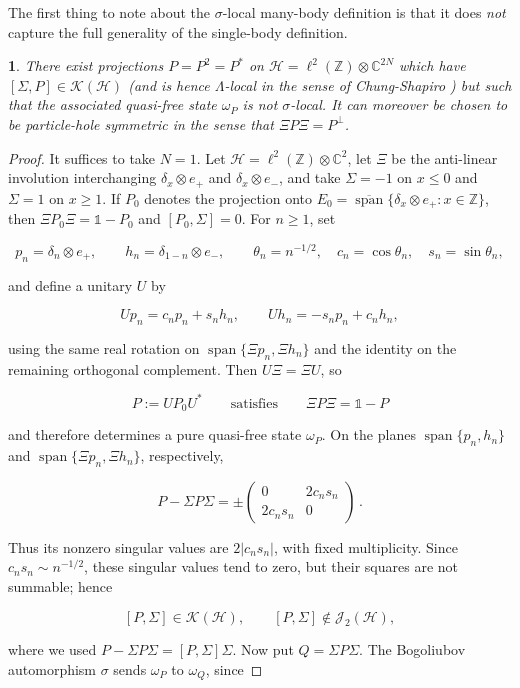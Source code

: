\documentclass[a4paper,10pt]{article}
\numberwithin{equation}{section}
\theoremstyle{plain}
\theoremstyle{plain}
\theoremstyle{plain}
\theoremstyle{plain}
\theoremstyle{plain}
\newtheorem{claim}[claim]{\protect\claimname}
\theoremstyle{remark}
\theoremstyle{definition}
\providecommand{\claimname}{Claim}
\newcommand{\ZZ}{\mathbb{Z}}
\newcommand{\CC}{\mathbb{C}}
\newcommand{\calH}{\mathcal{H}}
\newcommand{\calK}{\mathcal{K}}
\newcommand{\szpan}{\operatorname{span}}
\newcommand{\Id}{\mathds{1}}
\begin{document}
The first thing to note about the $\sigma$-local many-body definition is that it does \emph{not} capture the full generality of the single-body definition.
\begin{claim}
    There exist projections $P=P^2=P^\ast$ on $\calH=\ell^2(\ZZ)\otimes\CC^{2N}$ which have $[\Sigma,P]\in\calK(\calH)$ (and is hence $\Lambda$-local in the sense of Chung-Shapiro \cite{ChungShapiro2023}) but such that the associated quasi-free state $\omega_P$ is \emph{not} $\sigma$-local. It can moreover be chosen to be particle-hole symmetric in the sense that $\Xi P \Xi = P^\perp$.
\end{claim}
\begin{proof}
It suffices to take \(N=1\). Let \(\calH=\ell^2(\ZZ)\otimes\CC^2\), let \(\Xi\) be the anti-linear involution interchanging \(\delta_x\otimes e_+\) and \(\delta_x\otimes e_-\), and take \(\Sigma=-1\) on \(x\leq0\) and \(\Sigma=1\) on \(x\geq1\). If \(P_0\) denotes the projection onto \(E_0=\overline{\szpan}\{\delta_x\otimes e_+:x\in\ZZ\}\), then \(\Xi P_0\Xi=\Id-P_0\) and \([P_0,\Sigma]=0\). For \(n\geq1\), set

$$
p_n=\delta_n\otimes e_+,\qquad h_n=\delta_{1-n}\otimes e_-,\qquad
\theta_n=n^{-1/2},\quad c_n=\cos\theta_n,\quad s_n=\sin\theta_n,
$$

and define a unitary \(U\) by

$$
Up_n=c_np_n+s_nh_n,\qquad Uh_n=-s_np_n+c_nh_n,
$$

using the same real rotation on \(\szpan\{\Xi p_n,\Xi h_n\}\) and the identity on the remaining orthogonal complement. Then \(U\Xi=\Xi U\), so

$$
P:=UP_0U^*
\qquad\text{satisfies}\qquad
\Xi P\Xi=\Id-P
$$

and therefore determines a pure quasi-free state \(\omega_P\). On the planes \(\szpan\{p_n,h_n\}\) and \(\szpan\{\Xi p_n,\Xi h_n\}\), respectively,

$$
P-\Sigma P\Sigma
=\pm
\begin{pmatrix}
0&2c_ns_n\\
2c_ns_n&0
\end{pmatrix}\,.
$$

Thus its nonzero singular values are \(2|c_ns_n|\), with fixed multiplicity. Since \(c_ns_n\sim n^{-1/2}\), these singular values tend to zero, but their squares are not summable; hence

$$
[P,\Sigma]\in\calK(\calH),
\qquad
[P,\Sigma]\notin\mathcal J_2(\calH),
$$

where we used \(P-\Sigma P\Sigma=[P,\Sigma]\Sigma\). Now put \(Q=\Sigma P\Sigma\). The Bogoliubov automorphism \(\sigma\) sends \(\omega_P\) to \(\omega_Q\), since


\end{proof}
\end{document}
